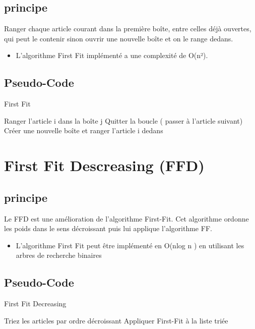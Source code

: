 \documentclass[class=article, crop=false]{standalone}
\begin{document}
\subsection{principe}
Ranger chaque article courant dans la première boîte, entre celles déjà ouvertes, qui peut le contenir sinon ouvrir une nouvelle boîte et on le range dedans.
\begin{itemize}
    \item L’algorithme First Fit implémenté a une complexité de O(n²). 
\end{itemize}

\subsection{Pseudo-Code}
\begin{algorithm}[H]
    \caption{First Fit}
    \begin{algorithmic}
              \STATE Ranger l’article i dans la boîte j
              \STATE Quitter la boucle ( passer à l'article suivant)
             \ENDIF 
        \ENDFOR
            \STATE Créer une nouvelle boîte et ranger l’article i dedans
        \ENDIF
    \ENDFOR
    \end{algorithmic}
\end{algorithm}

\section{First Fit Descreasing (FFD)}
\subsection{principe}
Le FFD est une amélioration de l’algorithme First-Fit. Cet algorithme ordonne les poids dans le sens décroissant puis lui applique l’algorithme FF.
\begin{itemize}
    \item L’algorithme First Fit peut être implémenté en O(nlog n ) en utilisant les arbres de recherche binaires 
\end{itemize}

\subsection{Pseudo-Code}
\begin{algorithm}
    \caption{First Fit Decreasing }
    \begin{algorithmic}
        \STATE Triez les articles par ordre décroissant
        \STATE Appliquer First-Fit à la liste triée 
    \end{algorithmic}
\end{algorithm}
\end{document}
